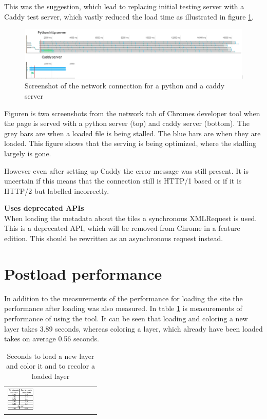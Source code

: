 This was the suggestion, which lead to replacing initial testing server with a Caddy test server, which vastly reduced the load time as illustrated in figure \ref{CaddyVsPython}.

\begin{figure} [H]
	\centering
	\includegraphics[width=1\textwidth]{Pictures/CaddyVsPython}
	\caption{Screenshot of the network connection for a python and a caddy server}
	\label{CaddyVsPython}
\end{figure}

Figuren is two screenshots from the network tab of Chromes developer tool when the page is served with a python server (top) and caddy server (bottom). 
The grey bars are when a loaded file is being stalled. The blue bars are when they are loaded. This figure shows that the serving is being optimized, where the stalling largely is gone. 

However even after setting up Caddy the error message was still present. It is uncertain if this means that the connection still is HTTP/1 based or if it is HTTP/2 but labelled incorrectly. 




\textbf{Uses deprecated APIs}\\
When loading the metadata about the tiles a synchronous XMLRequest is used. This is a deprecated API, which will be removed from Chrome in a feature edition. This should be rewritten as an asynchronous request instead.
\citep{OldApis}

\section{Postload performance}

In addition to the measurements of the performance for loading the site the performance after loading was also measured. In table \ref{tabPostloadPerformance} is measurements of performance of using the tool. It can be seen that loading and coloring a new layer takes 3.89 seconds, whereas coloring a layer, which already have been loaded takes on average 0.56 seconds. 

\begin{table}[htbp]
	\centering
	\begin{tabular}{l}
		\includegraphics[width=0.3\textwidth]{Pictures/tabPostloadPerformance}
	\end{tabular}
	\caption{Seconds to load a new layer and color it and to recolor a loaded layer}
	\label{tabPostloadPerformance}
\end{table}